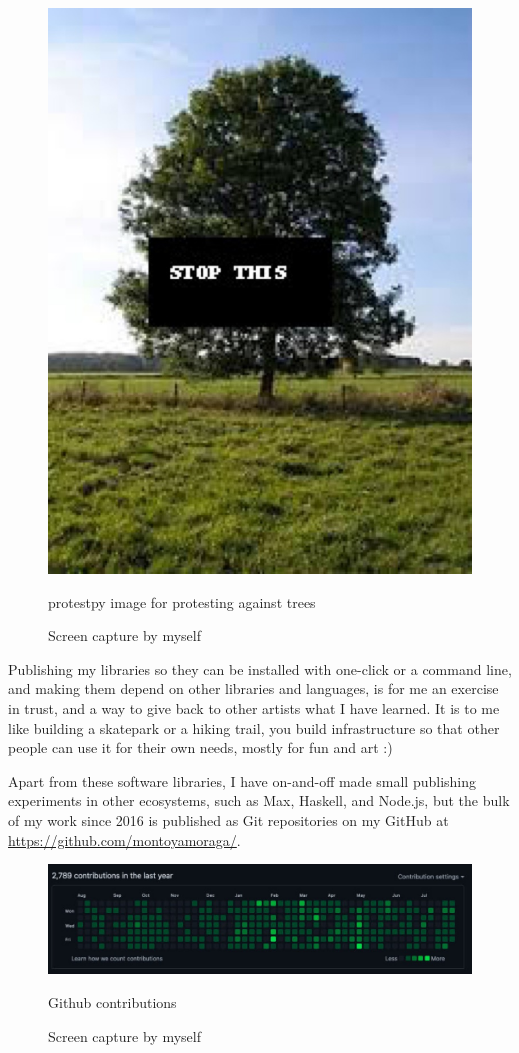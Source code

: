 \begin{figure}[ht]
  \centering
  \includegraphics[width=0.75\linewidth,height=0.35\textheight,keepaspectratio]{images/protestpy.jpg}
  \caption{protestpy image for protesting against trees}
  \caption*{Screen capture by myself}
  \label{fig:protestpy-tree}
\end{figure}

Publishing my libraries so they can be installed with one-click or a command line, and making them depend on other libraries and languages, is for me an exercise in trust, and a way to give back to other artists what I have learned. It is to me like building a skatepark or a hiking trail, you build infrastructure so that other people can use it for their own needs, mostly for fun and art :)

Apart from these software libraries, I have on-and-off made small publishing experiments in other ecosystems, such as Max, Haskell, and Node.js, but the bulk of my work since 2016 is published as \gls{Git} repositories on my GitHub at \url{https://github.com/montoyamoraga/}.

\begin{figure}[ht]
  \centering
  \includegraphics[width=0.80\linewidth,height=0.40\textheight,keepaspectratio]{images/github-contributions.jpg}
  \caption{Github contributions}
  \caption*{Screen capture by myself}
  \label{fig:github-contributions}
\end{figure}

